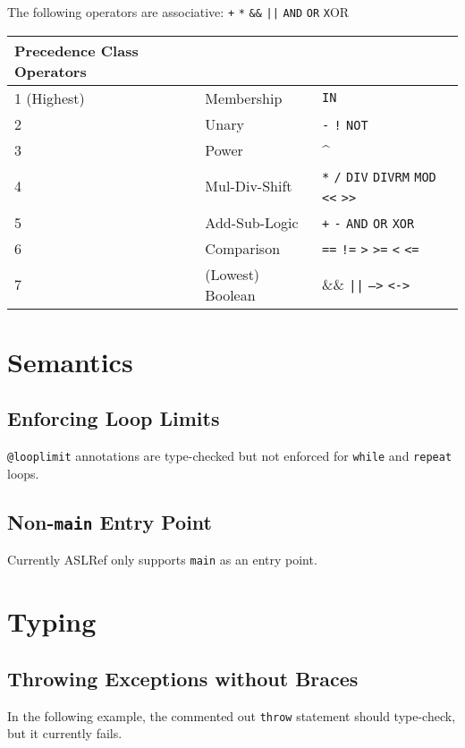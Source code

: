 The following operators are associative: \texttt{+} \texttt{*} \texttt{\&\&} \texttt{||} \texttt{AND} \texttt{OR} \texttt{X}OR

\begin{center}
\begin{tabular}{lll}
  \hline
Precedence Class Operators\\
\hline
1 (Highest) & Membership & \texttt{IN}\\
2 & Unary & \texttt{-} \texttt{!} \texttt{NOT}\\
3 & Power & \textasciicircum\\
4 & Mul-Div-Shift & \texttt{*} \texttt{/} \texttt{DIV} \texttt{DIVRM} \texttt{MOD} \texttt{<<} \texttt{>>}\\
5 & Add-Sub-Logic & \texttt{+} \texttt{-} \texttt{AND} \texttt{OR} \texttt{XOR}\\
6 & Comparison & \texttt{==} \texttt{!=} \texttt{>} \texttt{>=} \texttt{<} \texttt{<=}\\
7 & (Lowest) Boolean & \&\& \texttt{||} \texttt{-->} \texttt{<->}\\
\hline
\end{tabular}
\end{center}

\section{Semantics}

\subsection{Enforcing Loop Limits}
\verb|@looplimit| annotations are type-checked but not enforced for \texttt{while} and \texttt{repeat} loops.

\subsection{Non-\texttt{main} Entry Point}
Currently ASLRef only supports \texttt{main} as an entry point.

\section{Typing}

\subsection{Throwing Exceptions without Braces}
In the following example, the commented out \texttt{throw} statement should type-check,
but it currently fails.

